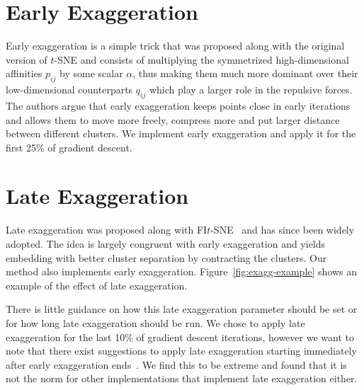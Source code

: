 \section{Early Exaggeration}

Early exaggeration is a simple trick that was proposed along with the original
version of $t$-SNE and consists of multiplying the symmetrized high-dimensional
affinities $p_{ij}$ by some scalar $\alpha$, thus making them much more
dominant over their low-dimensional counterparts $q_{ij}$ which play a larger
role in the repulsive forces. The authors argue that early exaggeration keeps
points close in early iterations and allows them to move more freely, compress
more and put larger distance between different clusters. We implement early
exaggeration and apply it for the first 25\% of gradient descent.

\section{Late Exaggeration}

Late exaggeration was proposed along with FI$t$-SNE~\cite{fitsne} and has since
been widely adopted. The idea is largely congruent with early exaggeration and
yields embedding with better cluster separation by contracting the clusters.
Our method also implements early exaggeration. Figure~\ref{fig:exagg-example}
shows an example of the effect of late exaggeration.

There is little guidance
on how this late exaggeration parameter should be set or for how long late
exaggeration should be run. We chose to apply late exaggeration for the last
10\% of gradient descent iterations, however we want to note that there exist
suggestions to apply late exaggeration starting immediately after early
exaggeration ends~\cite{arttsne}. We find this to be extreme and found that it
is not the norm for other implementations that implement late exaggeration
either.

